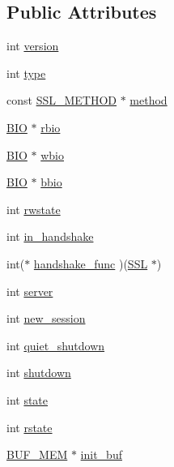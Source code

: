 \subsection*{Public Attributes}
\begin{DoxyCompactItemize}
\item 
int \hyperlink{structssl__st_a104b2a57e68e7e8c228c34d9ffb0e3dd}{version}
\item 
int \hyperlink{structssl__st_a5d2a229f22c169bd5eecefd9f017e089}{type}
\item 
const \hyperlink{ssl_8h_a74d54b9a714accac31c73bfb55973e81}{S\+S\+L\+\_\+\+M\+E\+T\+H\+OD} $\ast$ \hyperlink{structssl__st_a10dff58d99726fe56b47ec037c54802e}{method}
\item 
\hyperlink{bio_8h_af3fabae1c9af50b9312cdff41e11d1dd}{B\+IO} $\ast$ \hyperlink{structssl__st_abd180ca9a0f2fb959b07600dcca58118}{rbio}
\item 
\hyperlink{bio_8h_af3fabae1c9af50b9312cdff41e11d1dd}{B\+IO} $\ast$ \hyperlink{structssl__st_a81a174cdc5f516202537ff6fef6680ed}{wbio}
\item 
\hyperlink{bio_8h_af3fabae1c9af50b9312cdff41e11d1dd}{B\+IO} $\ast$ \hyperlink{structssl__st_ab0e7dbfa9d11fab6879da0ad8625b65b}{bbio}
\item 
int \hyperlink{structssl__st_a10e8e706cff52214bc873c05786a80ce}{rwstate}
\item 
int \hyperlink{structssl__st_afc46f99873655d3532930b3f0abb3f98}{in\+\_\+handshake}
\item 
int($\ast$ \hyperlink{structssl__st_affcb724b5991a587b79a2f91ac7a5a7c}{handshake\+\_\+func} )(\hyperlink{ossl__typ_8h_a71f21e09bf365489dab9d85bd4785e24}{S\+SL} $\ast$)
\item 
int \hyperlink{structssl__st_a022f1e4cf3a0a68ffc4f4d80d4de8d6b}{server}
\item 
int \hyperlink{structssl__st_a5e265a8751b5a1641b71efda933a6b61}{new\+\_\+session}
\item 
int \hyperlink{structssl__st_a3e921ca488cd9eec6ad4065ef627395a}{quiet\+\_\+shutdown}
\item 
int \hyperlink{structssl__st_a12a82cfd124852a54354a46012bdd502}{shutdown}
\item 
int \hyperlink{structssl__st_acf88d642e936bdeb73777730b63f70f6}{state}
\item 
int \hyperlink{structssl__st_a30d0255e120ff83b3c35ab05cd3dae64}{rstate}
\item 
\hyperlink{ossl__typ_8h_aaea4d745bf2689d2009791186616bb3c}{B\+U\+F\+\_\+\+M\+EM} $\ast$ \hyperlink{structssl__st_ae79d4878386098526f000f857b38854f}{init\+\_\+buf}

\end{DoxyCompactItemize}
